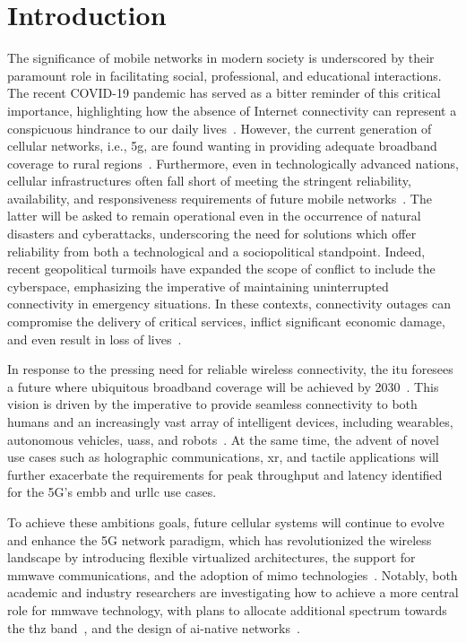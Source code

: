 \glsresetall
\chapter{Introduction}
\label{ch:intro}

The significance of mobile networks in modern society is underscored by their paramount role in facilitating social, professional, and educational interactions. The recent COVID-19 pandemic has served as a bitter reminder of this critical importance, highlighting how the absence of Internet connectivity can represent a conspicuous hindrance to our daily lives~\cite{feldmann2021year}.
However, the current generation of cellular networks, i.e., \gls{5g}, are found wanting in providing adequate broadband coverage to rural regions~\cite{yaacoub2020key}. Furthermore, even in technologically advanced nations, cellular infrastructures often fall short of meeting the stringent reliability, availability, and responsiveness requirements of future mobile networks~\cite{giordani2020non}. The latter will be asked to remain operational even in the occurrence of natural disasters and cyberattacks, underscoring the need for solutions which offer reliability from both a technological and a sociopolitical standpoint.
Indeed, recent geopolitical turmoils have expanded the scope of conflict to include the cyberspace, emphasizing the imperative of maintaining uninterrupted connectivity in emergency situations. In these contexts, connectivity outages can compromise the delivery of critical services, inflict significant economic damage, and even result in loss of lives~\cite{internet_ukr_afg}.

In response to the pressing need for reliable wireless connectivity, the \gls{itu} foresees a future where ubiquitous broadband coverage will be achieved by 2030~\cite{imt2030}. This vision is driven by the imperative to provide seamless connectivity to both humans and an increasingly vast array of intelligent devices, including wearables, autonomous vehicles, \glspl{uas}, and robots~\cite{mozaffari2018beyond}.
At the same time, the advent of novel use cases such as holographic communications, \gls{xr}, and tactile applications will further exacerbate the requirements for peak throughput and latency identified for the 5G's \gls{embb} and \gls{urllc} use cases. 

To achieve these ambitions goals, future cellular systems will continue to evolve and enhance the 5G network paradigm, which has revolutionized the wireless landscape by introducing flexible virtualized architectures, the support for \gls{mmwave} communications, and the adoption of \gls{mimo} technologies~\cite{ghosh20195g}. 
Notably, both academic and industry researchers are investigating how to achieve a more central role for \gls{mmwave} technology, with plans to allocate additional spectrum towards the \gls{thz} band~\cite{9887921}, and the design of \gls{ai}-native networks~\cite{letaief2019roadmap}.

